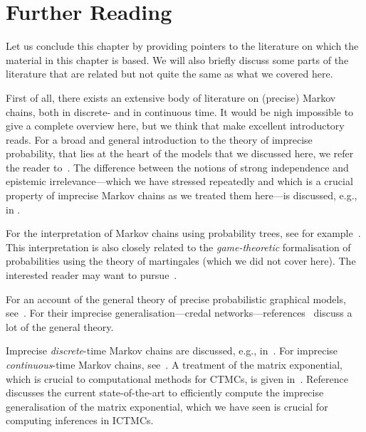 \documentclass[graybox]{svmult}
\begin{document}
\section{Further Reading}\label{sec:further_reading}

Let us conclude this chapter by providing pointers to the literature on which the material in this chapter is based. We will also briefly discuss some parts of the literature that are related but not quite the same as what we covered here.

First of all, there exists an extensive body of literature on (precise) Markov chains, both in discrete- and in continuous time. It would be nigh impossible to give a complete overview here, but we think that \cite{norris1998markov, anderson1991} make excellent introductory reads. For a broad and general introduction to the theory of imprecise probability, that lies at the heart of the models that we discussed here, we refer the reader to~\cite{Walley:1991vk,augustin:2014}. The difference between the notions of strong independence and epistemic irrelevance---which we have stressed repeatedly and which is a crucial property of imprecise Markov chains as we treated them here---is discussed, e.g., in \cite{couso:2000, chap_irr_ind:itip:2014}.

For the interpretation of Markov chains using probability trees, see for example~\cite{decooman:2008, destercke:2008, stavros:phd:2017}. This interpretation is also closely related to the \emph{game-theoretic} formalisation of probabilities using the theory of martingales (which we did not cover here). The interested reader may want to pursue~\cite{decooman:2008, chap:game_theo:itip, stavros:phd:2017}.

For an account of the general theory of precise probabilistic graphical models, see~\cite{pearl:1988}. For their imprecise generalisation---credal networks---references~\cite{cozman:2000, cozman:2005, chap_pgm:itip, de2015credal, debock:2017} discuss a lot of the general theory.

Imprecise \emph{discrete}-time Markov chains are discussed, e.g., in~\cite{deCooman:2010gd, augustin2013:itip, decooman:2016}. For imprecise \emph{continuous}-time Markov chains, see~\cite{Skulj:2015cq, krak2016ictmc}. A treatment of the matrix exponential, which is crucial to computational methods for CTMCs, is given in~\cite{vanloan:1975}. Reference~\cite{erreygers2017imprecise} discusses the current state-of-the-art to efficiently compute the imprecise generalisation of the matrix exponential, which we have seen is crucial for computing inferences in ICTMCs.
\end{document}

